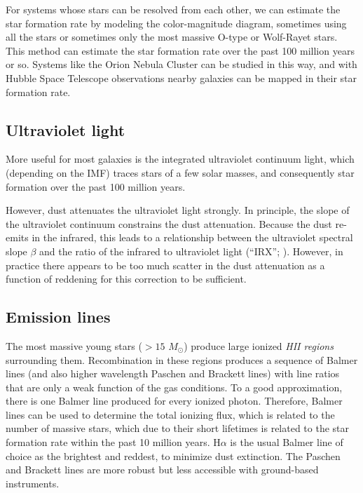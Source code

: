 For systems whose stars can be resolved from each other, we can
estimate the star formation rate by modeling the color-magnitude
diagram, sometimes using all the stars or sometimes only the most
massive O-type or Wolf-Rayet stars. This method can estimate the star
formation rate over the past 100 million years or so. Systems like the
Orion Nebula Cluster can be studied in this way, and with Hubble
Space Telescope observations nearby galaxies can be mapped in their
star formation rate.

\subsection{Ultraviolet light}

More useful for most galaxies is the integrated ultraviolet continuum
light, which (depending on the IMF) traces stars of a few solar
masses, and consequently star formation over the past 100 million
years.

However, dust attenuates the ultraviolet light strongly. In principle,
the slope of the ultraviolet continuum constrains the dust
attenuation. Because the dust re-emits in the infrared, this leads to
a relationship between the ultraviolet spectral slope $\beta$ and the
ratio of the infrared to ultraviolet light
(``IRX''; \citealt{overzier11a, grasha13a}). However, in practice
there appears to be too much scatter in the dust attenuation as a
function of reddening for this correction to be sufficient.

\subsection{Emission lines}

The most massive young stars ($>15$ $M_\odot$) produce large ionized
{\it HII regions} surrounding them. Recombination in these regions
produces a sequence of Balmer lines (and also higher wavelength
Paschen and Brackett lines) with line ratios that are only a weak
function of the gas conditions. To a good approximation, there is one
Balmer line produced for every ionized photon. Therefore, Balmer lines
can be used to determine the total ionizing flux, which is related to
the number of massive stars, which due to their short lifetimes is
related to the star formation rate within the past 10 million
years. H$\alpha$ is the usual Balmer line of choice as the brightest
and reddest, to minimize dust extinction. The Paschen and Brackett
lines are more robust but less accessible with ground-based
instruments.

